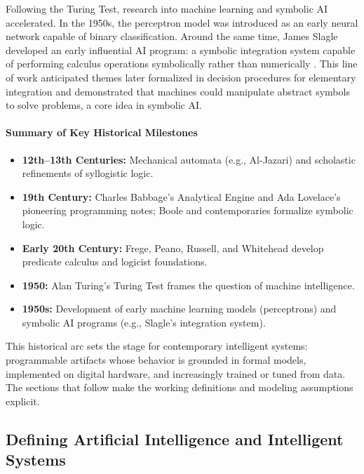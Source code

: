 Following the Turing Test, research into machine learning and symbolic AI accelerated. In the 1950s, the perceptron model was introduced as an early neural network capable of binary classification. Around the same time, James Slagle developed an early influential AI program: a symbolic integration system capable of performing calculus operations symbolically rather than numerically \citep{Slagle1963}. This line of work anticipated themes later formalized in decision procedures for elementary integration \citep{Risch1969} and demonstrated that machines could manipulate abstract symbols to solve problems, a core idea in symbolic AI.

\paragraph{Summary of Key Historical Milestones}

\begin{itemize}
    \item \textbf{12th--13th Centuries:} Mechanical automata (e.g., Al-Jazari) and scholastic refinements of syllogistic logic.
    \item \textbf{19th Century:} Charles Babbage's Analytical Engine and Ada Lovelace's pioneering programming notes; Boole and contemporaries formalize symbolic logic.
    \item \textbf{Early 20th Century:} Frege, Peano, Russell, and Whitehead develop predicate calculus and logicist foundations.
    \item \textbf{1950:} Alan Turing's Turing Test frames the question of machine intelligence.
    \item \textbf{1950s:} Development of early machine learning models (perceptrons) and symbolic AI programs (e.g., Slagle's integration system).
\end{itemize}

This historical arc sets the stage for contemporary intelligent systems: programmable artifacts whose behavior is grounded in formal models, implemented on digital hardware, and increasingly trained or tuned from data. The sections that follow make the working definitions and modeling assumptions explicit.


\subsection{Defining Artificial Intelligence and Intelligent Systems}
\label{sec:intro_defining_artificial_intelligence_and_intelligent_systems}

